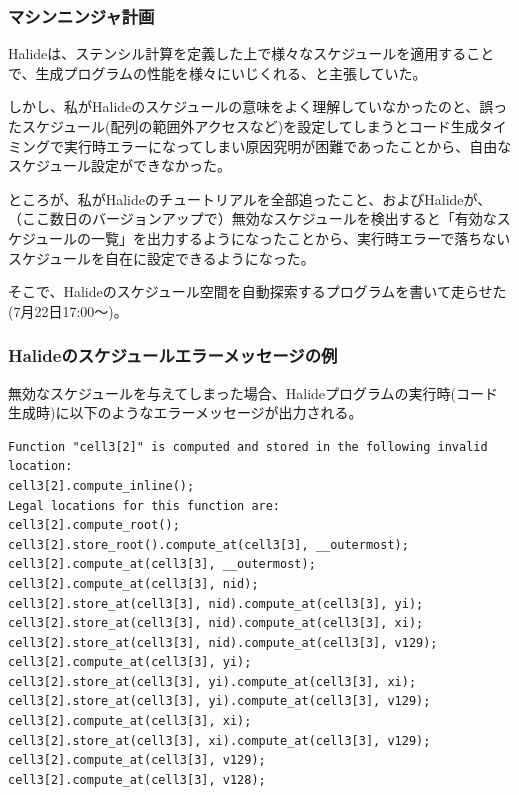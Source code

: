 \documentclass[dvipdfmx,cjk]{beamer}
\begin{document}
\begin{frame}\frametitle{マシンニンジャ計画}
  Halideは、ステンシル計算を定義した上で様々なスケジュールを適用することで、生成プログラムの性能を様々にいじくれる、と主張していた。

  しかし、私がHalideのスケジュールの意味をよく理解していなかったのと、誤ったスケジュール(配列の範囲外アクセスなど)を設定してしまうとコード生成タイミングで実行時エラーになってしまい原因究明が困難であったことから、自由なスケジュール設定ができなかった。

  ところが、私がHalideのチュートリアルを全部追ったこと、およびHalideが、（ここ数日のバージョンアップで）無効なスケジュールを検出すると「有効なスケジュールの一覧」を出力するようになったことから、実行時エラーで落ちないスケジュールを自在に設定できるようになった。

  そこで、Halideのスケジュール空間を自動探索するプログラムを書いて走らせた(7月22日17:00〜)。
\end{frame}


\begin{frame}[fragile]\frametitle{Halideのスケジュールエラーメッセージの例}

無効なスケジュールを与えてしまった場合、Halideプログラムの実行時(コード生成時)に以下のようなエラーメッセージが出力される。

\begingroup \fontsize{8pt}{9pt}\selectfont
\begin{verbatim}
Function "cell3[2]" is computed and stored in the following invalid location:
cell3[2].compute_inline();
Legal locations for this function are:
cell3[2].compute_root();
cell3[2].store_root().compute_at(cell3[3], __outermost);
cell3[2].compute_at(cell3[3], __outermost);
cell3[2].compute_at(cell3[3], nid);
cell3[2].store_at(cell3[3], nid).compute_at(cell3[3], yi);
cell3[2].store_at(cell3[3], nid).compute_at(cell3[3], xi);
cell3[2].store_at(cell3[3], nid).compute_at(cell3[3], v129);
cell3[2].compute_at(cell3[3], yi);
cell3[2].store_at(cell3[3], yi).compute_at(cell3[3], xi);
cell3[2].store_at(cell3[3], yi).compute_at(cell3[3], v129);
cell3[2].compute_at(cell3[3], xi);
cell3[2].store_at(cell3[3], xi).compute_at(cell3[3], v129);
cell3[2].compute_at(cell3[3], v129);
cell3[2].compute_at(cell3[3], v128);
\end{verbatim}
\endgroup

\end{frame}
\end{document}
